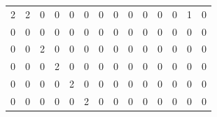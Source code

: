 \documentclass[10pt,twocolumn,letterpaper]{article}
\begin{document}
\begin{table}[h]
\centering
\begin{tabular}{llllllllllllll}
\cellcolor[HTML]{9AFF99}2 & 2                         & 0                         & 0                         & 0                         & 0                         & 0                         & 0                         & 0                         & 0                         & 0                         & 0                         & 1                         & 0                         \\
0                         & \cellcolor[HTML]{9AFF99}0 & 0                         & 0                         & 0                         & 0                         & 0                         & 0                         & 0                         & 0                         & 0                         & 0                         & 0                         & 0                         \\
0                         & 0                         & \cellcolor[HTML]{9AFF99}2 & 0                         & 0                         & 0                         & 0                         & 0                         & 0                         & 0                         & 0                         & 0                         & 0                         & 0                         \\
0                         & 0                         & 0                         & \cellcolor[HTML]{9AFF99}2 & 0                         & 0                         & 0                         & 0                         & 0                         & 0                         & 0                         & 0                         & 0                         & 0                         \\
0                         & 0                         & 0                         & 0                         & \cellcolor[HTML]{9AFF99}2 & 0                         & 0                         & 0                         & 0                         & 0                         & 0                         & 0                         & 0                         & 0                         \\
0                         & 0                         & 0                         & 0                         & 0                         & \cellcolor[HTML]{9AFF99}2 & 0                         & 0                         & 0                         & 0                         & 0                         & 0                         & 0                         & 0                         \\

\end{tabular}
\end{table}
\end{document}
